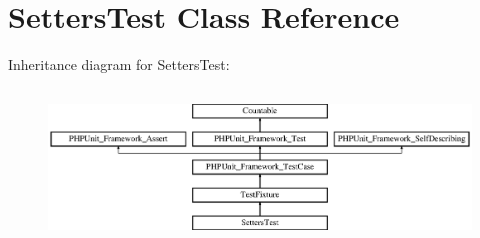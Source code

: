 \section{Setters\+Test Class Reference}
\label{class_setters_test}
Inheritance diagram for Setters\+Test\+:\begin{figure}[H]
\begin{center}
\leavevmode
\includegraphics[height=4.129793cm]{class_setters_test}
\end{center}
\end{figure}
